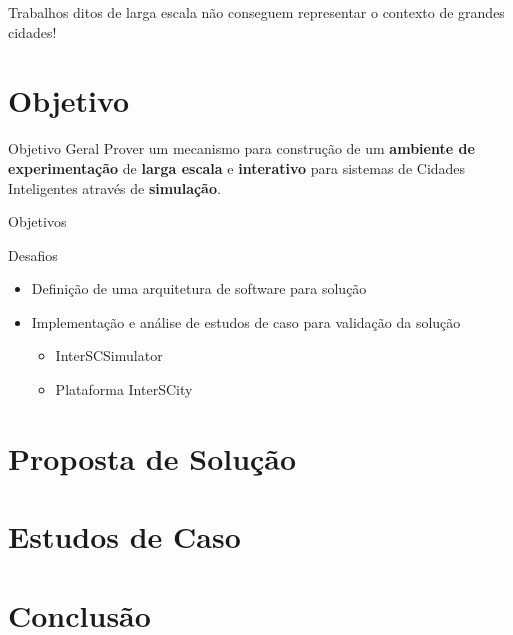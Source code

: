 \documentclass[xcolor={usenames,svgnames,dvipsnames},brazil,english,12pt,aspectratio=149]{beamer}
\begin{document}
\begin{frame}[standout]
	Trabalhos ditos de larga escala não conseguem representar o contexto de grandes cidades!
\end{frame}

\section{Objetivo}

\begin{frame}
    \begin{block}{Objetivo Geral}
        Prover um mecanismo para construção de um \textbf{ambiente de experimentação} de \textbf{larga escala} e \textbf{interativo} para sistemas de Cidades Inteligentes através de \textbf{simulação}.
    \end{block}
\end{frame}

\begin{frame}{Objetivos}
    \begin{block}{Desafios}
        \begin{itemize}
            \item Definição de uma arquitetura de software para solução
            \item Implementação e análise de estudos de caso para validação da solução
                \begin{itemize}
                    \item InterSCSimulator
                    \item Plataforma InterSCity
                \end{itemize}
        \end{itemize}
    \end{block}
\end{frame}


\section{Proposta de Solução}
\section{Estudos de Caso}
\section{Conclusão}
\end{document}
